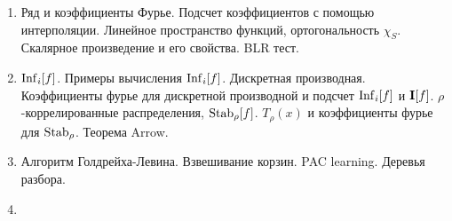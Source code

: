 \begin{enumerate}
    \item Ряд и коэффициенты Фурье. Подсчет коэффициентов с помощью интерполяции. Линейное пространство функций, ортогональность
        $\chi_S$. Скалярное произведение и его свойства. BLR тест.
    \item $\mathrm{Inf}_i[f]$. Примеры вычисления $\mathrm{Inf}_i[f]$. Дискретная производная. Коэффициенты фурье для дискретной производной и 
        подсчет $\mathrm{Inf}_i[f]$ и $\mathbf{I}[f]$. $\rho$-коррелированные распределения, $\mathrm{Stab}_{\rho}[f]$. $T_{\rho}(x)$ и коэффициенты фурье
        для $\mathrm{Stab}_{\rho}$. Теорема Arrow.
    \item Алгоритм Голдрейха-Левина. Взвешивание корзин. PAC learning. Деревья разбора.
    \item 
\end{enumerate}